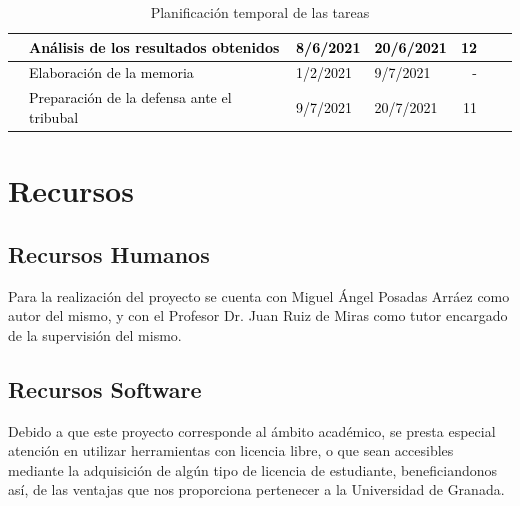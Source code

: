 \begin{table}[H]
\begin{adjustbox}{angle=90, max height=\textheight}
\begin{tabular}{|clllrrl|}
    \rowcolor{white} \multicolumn{1}{|l}{}  & \textcolor{black}{Análisis de los resultados obtenidos} & \textcolor{black}{8/6/2021}         & \textcolor{black}{20/6/2021} &\textcolor{black}{12}&\\
    \hline
    \rowcolor{white} \multicolumn{1}{|l}{}  & \textcolor{black}{Elaboración de la memoria} & \textcolor{black}{1/2/2021}         & \textcolor{black}{9/7/2021} &\textcolor{black}{-}&\\
    \hline
    \rowcolor{white} \multicolumn{1}{|l}{}  & \textcolor{black}{Preparación de la defensa ante el tribubal} & \textcolor{black}{9/7/2021}         & \textcolor{black}{20/7/2021} &\textcolor{black}{11}&\\                                  
    \hline
    \end{tabular}
    \end{adjustbox}
    \caption{Planificación temporal de las tareas}
    \label{fig:presupuesto}
\end{table}

\section{Recursos}
\subsection{Recursos Humanos}
Para la realización del proyecto se cuenta con Miguel Ángel Posadas Arráez como autor del mismo, y con el Profesor Dr. Juan Ruiz de Miras como tutor encargado de la supervisión del mismo.

\subsection{Recursos Software}
Debido a que este proyecto corresponde al ámbito académico, se presta especial atención en utilizar herramientas con licencia libre, o que sean accesibles mediante la adquisición de algún tipo de licencia de estudiante, beneficiandonos así, de las ventajas que nos proporciona pertenecer a la Universidad de Granada.\\

